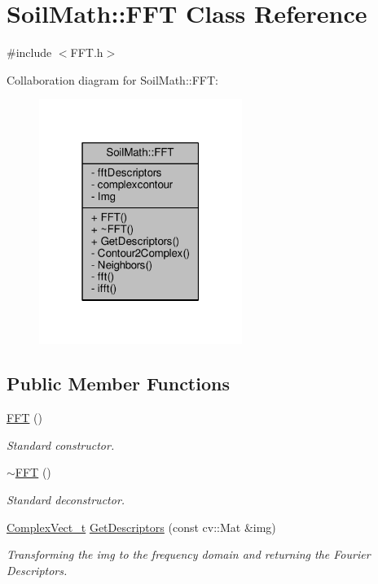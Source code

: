 \hypertarget{class_soil_math_1_1_f_f_t}{}\section{Soil\+Math\+:\+:F\+F\+T Class Reference}
\label{class_soil_math_1_1_f_f_t}


{\ttfamily \#include $<$F\+F\+T.\+h$>$}



Collaboration diagram for Soil\+Math\+:\+:F\+F\+T\+:\nopagebreak
\begin{figure}[H]
\begin{center}
\leavevmode
\includegraphics[width=187pt]{class_soil_math_1_1_f_f_t__coll__graph}
\end{center}
\end{figure}
\subsection*{Public Member Functions}
\begin{DoxyCompactItemize}
\item 
\hyperlink{class_soil_math_1_1_f_f_t_a52638bf8f971d1448e46b2b6db5f5e8b}{F\+F\+T} ()
\begin{DoxyCompactList}\small\item\em Standard constructor. \end{DoxyCompactList}\item 
\hyperlink{class_soil_math_1_1_f_f_t_a279862b286d865ebc5aa707f94f19d73}{$\sim$\+F\+F\+T} ()
\begin{DoxyCompactList}\small\item\em Standard deconstructor. \end{DoxyCompactList}\item 
\hyperlink{_soil_math_types_8h_a7567e521c2b2c408dcb62dbff72390f7}{Complex\+Vect\+\_\+t} \hyperlink{class_soil_math_1_1_f_f_t_af5fb6f4804079ee184a314e2f0a0f2fc}{Get\+Descriptors} (const cv\+::\+Mat \&img)
\begin{DoxyCompactList}\small\item\em Transforming the img to the frequency domain and returning the Fourier Descriptors. \end{DoxyCompactList}\end{DoxyCompactItemize}
